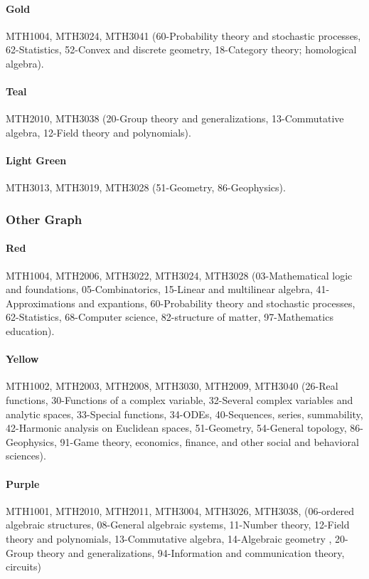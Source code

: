 \documentclass[english, 12pt]{article}
\begin{document}
\paragraph{Gold} MTH1004, MTH3024, MTH3041 (60-Probability theory and stochastic processes, 62-Statistics, 52-Convex and discrete geometry, 18-Category theory; homological algebra).
\paragraph{Teal} MTH2010, MTH3038 (20-Group theory and generalizations, 13-Commutative algebra, 12-Field theory and polynomials).
\paragraph{Light Green} MTH3013, MTH3019, MTH3028 (51-Geometry, 86-Geophysics).
\parskip=0.0pt

\subsubsection{Other Graph} \label{app:other_graph_communities}
\paragraph{Red} MTH1004, MTH2006, MTH3022, MTH3024, MTH3028 (03-Mathematical logic and foundations, 05-Combinatorics, 15-Linear and multilinear algebra, 41-Approximations and expantions, 60-Probability theory and stochastic processes, 62-Statistics, 68-Computer science, 82-structure of matter, 97-Mathematics education).
\parskip=-16.0pt
\paragraph{Yellow} MTH1002, MTH2003, MTH2008, MTH3030, MTH2009, MTH3040 (26-Real functions, 30-Functions of a complex variable, 32-Several complex variables and analytic spaces, 33-Special functions, 34-ODEs, 40-Sequences, series, summability, 42-Harmonic analysis on Euclidean spaces, 51-Geometry, 54-General topology, 86-Geophysics, 91-Game theory, economics, finance, and other social and behavioral sciences).
\paragraph{Purple} MTH1001, MTH2010, MTH2011, MTH3004, MTH3026, MTH3038, (06-ordered algebraic structures, 08-General algebraic systems, 11-Number theory, 12-Field theory and polynomials, 13-Commutative algebra, 14-Algebraic geometry , 20-Group theory and generalizations, 94-Information and communication theory, circuits)
\end{document}
